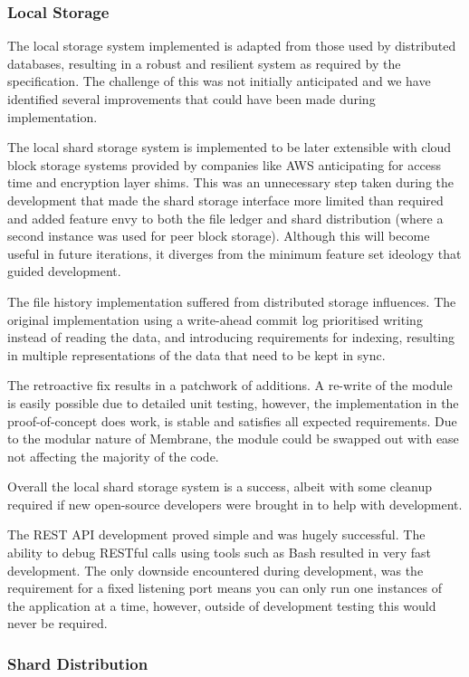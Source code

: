 \documentclass[11pt, a4paper, twoside]{report}
\begin{document}
\subsubsection{Local Storage}

The local storage system implemented is adapted from those used by distributed databases, resulting in a robust and resilient system as required by the specification. The challenge of this was not initially anticipated and we have identified several improvements that could have been made during implementation.

The local shard storage system is implemented to be later extensible with cloud block storage systems provided by companies like AWS anticipating for access time and encryption layer shims. This was an unnecessary step taken during the development that made the shard storage interface more limited than required and added feature envy to both the file ledger and shard distribution (where a second instance was used for peer block storage). Although this will become useful in future iterations, it diverges from the minimum feature set ideology that guided development.

The file history implementation suffered from distributed storage influences. The original implementation using a write-ahead commit log prioritised writing instead of reading the data, and introducing requirements for indexing, resulting in multiple representations of the data that need to be kept in sync.

The retroactive fix results in a patchwork of additions. A re-write of the module is easily possible due to detailed unit testing, however, the implementation in the proof-of-concept does work, is stable and satisfies all expected requirements. Due to the modular nature of Membrane, the module could be swapped out with ease not affecting the majority of the code.

Overall the local shard storage system is a success, albeit with some cleanup required if new open-source developers were brought in to help with development.

The REST API development proved simple and was hugely successful. The ability to debug RESTful calls using tools such as Bash resulted in very fast development. The only downside encountered during development, was the requirement for a fixed listening port means you can only run one instances of the application at a time, however, outside of development testing this would never be required.

\subsubsection{Shard Distribution}
\end{document}
